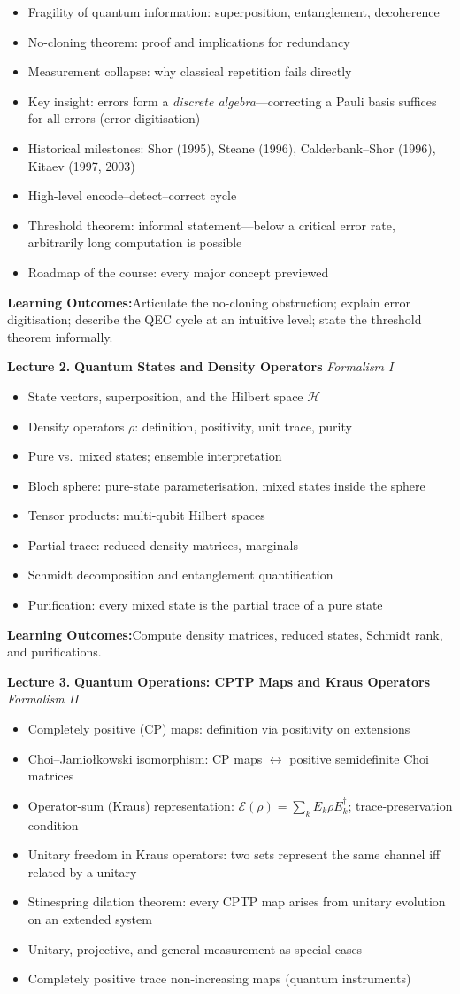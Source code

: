 \documentclass[12pt,oneside]{article}
\newcommand{\lecturetitle}[3]{%
  \vspace{10pt}
  \begin{tcolorbox}[
    enhanced,breakable,
    colback=highlight,colframe=accent,
    arc=2pt,left=10pt,right=8pt,top=7pt,bottom=7pt,boxrule=0.7pt
  ]
    \textbf{\color{accent}Lecture #1.\enspace}%
    {\color{primary}\bfseries #2}%
    \hfill{\small\color{warmgold}\textit{#3}}
  \end{tcolorbox}
  \vspace{-2pt}
}
\newcommand{\topics}[1]{%
  \begin{itemize}[leftmargin=1.5em,itemsep=1.5pt,topsep=3pt,parsep=0pt]
    #1
  \end{itemize}\vspace{2pt}
}
\newcommand{\T}[1]{\item #1}
\newcommand{\keybox}[1]{%
  \begin{tcolorbox}[
    enhanced,colback=lightgray,colframe=rulegray,
    arc=2pt,left=8pt,right=8pt,top=5pt,bottom=5pt,boxrule=0.4pt,
    fontupper=\small
  ]
    \textbf{\color{primary}Learning Outcomes:\enspace}#1
  \end{tcolorbox}\vspace{4pt}
}
\begin{document}
\topics{
  \T{Fragility of quantum information: superposition, entanglement, decoherence}
  \T{No-cloning theorem: proof and implications for redundancy}
  \T{Measurement collapse: why classical repetition fails directly}
  \T{Key insight: errors form a \emph{discrete algebra}---correcting a Pauli basis suffices for all errors (error digitisation)}
  \T{Historical milestones: Shor (1995), Steane (1996), Calderbank--Shor (1996), Kitaev (1997, 2003)}
  \T{High-level encode--detect--correct cycle}
  \T{Threshold theorem: informal statement---below a critical error rate, arbitrarily long computation is possible}
  \T{Roadmap of the course: every major concept previewed}
}

\keybox{Articulate the no-cloning obstruction; explain error digitisation; describe the QEC cycle at an intuitive level; state the threshold theorem informally.}

\lecturetitle{2}{Quantum States and Density Operators}{Formalism I}

\topics{
  \T{State vectors, superposition, and the Hilbert space $\mathcal{H}$}
  \T{Density operators $\rho$: definition, positivity, unit trace, purity}
  \T{Pure vs.\ mixed states; ensemble interpretation}
  \T{Bloch sphere: pure-state parameterisation, mixed states inside the sphere}
  \T{Tensor products: multi-qubit Hilbert spaces}
  \T{Partial trace: reduced density matrices, marginals}
  \T{Schmidt decomposition and entanglement quantification}
  \T{Purification: every mixed state is the partial trace of a pure state}
}

\keybox{Compute density matrices, reduced states, Schmidt rank, and purifications.}

\lecturetitle{3}{Quantum Operations: CPTP Maps and Kraus Operators}{Formalism II}

\topics{
  \T{Completely positive (CP) maps: definition via positivity on extensions}
  \T{Choi--Jamio\l{}kowski isomorphism: CP maps $\leftrightarrow$ positive semidefinite Choi matrices}
  \T{Operator-sum (Kraus) representation: $\mathcal{E}(\rho)=\sum_k E_k \rho E_k^\dagger$; trace-preservation condition}
  \T{Unitary freedom in Kraus operators: two sets represent the same channel iff related by a unitary}
  \T{Stinespring dilation theorem: every CPTP map arises from unitary evolution on an extended system}
  \T{Unitary, projective, and general measurement as special cases}
  \T{Completely positive trace non-increasing maps (quantum instruments)}
}
\end{document}
